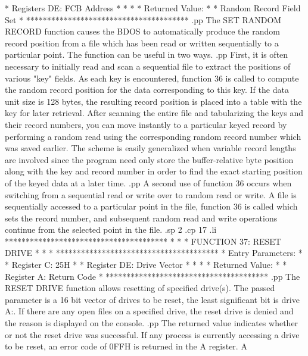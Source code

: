 *      Registers DE:  FCB Address     *
*                                     *
*  Returned   Value:                  *
*      Random Record Field Set        *
***************************************
.pp
The SET RANDOM RECORD function causes
the BDOS to automatically produce the random
record position from a file which has been read or
written sequentially to a particular point.  The function
can be useful in two ways.
.pp
First, it is often necessary to initially read and
scan a sequential file to extract the positions of
various "key" fields.  As each key is encountered, function
36 is called to compute the random record position
for the data corresponding to this key.  If the data
unit size is 128 bytes, the resulting record position
is placed into a table with the key for later retrieval.
After scanning the entire file and tabularizing the
keys and their record numbers, you can move instantly
to a particular keyed record by performing a random
read using the corresponding random record number
which was saved earlier.  The scheme is easily generalized
when variable record lengths are involved since the
program need only store the buffer-relative byte
position along with the key and record number in order
to find the exact starting position of the keyed data
at a later time.
.pp
A second use of function 36 occurs when switching from
a sequential read or write over to random read or
write.  A file is sequentially accessed to a particular
point in the file, function 36 is called which sets
the record number, and subsequent random read and
write operations continue from the selected point in
the file.
.sp 2
.cp 17
.li
***************************************
*                                     *
*  FUNCTION 37:  RESET DRIVE          *
*                                     *
***************************************
*  Entry Parameters:                  *
*      Register   C:  25H             *
*      Register  DE:  Drive Vector    *
*                                     *
*  Returned   Value:                  *
*      Register   A:  Return Code     *
***************************************
.pp
The  RESET  DRIVE  function  allows  resetting  of  specified
drive(s).  The passed parameter is a 16 bit vector of drives to be
reset,  the  least significant bit is drive A:.  If there are  any
open files on a specified drive,  the reset drive is denied and the
reason is displayed on the console.
.pp
The  returned value indicates whether or not the reset  drive
was successful.  If any process is currently accessing a drive  to
be reset,  an error code of 0FFH is returned in the A register.  A
